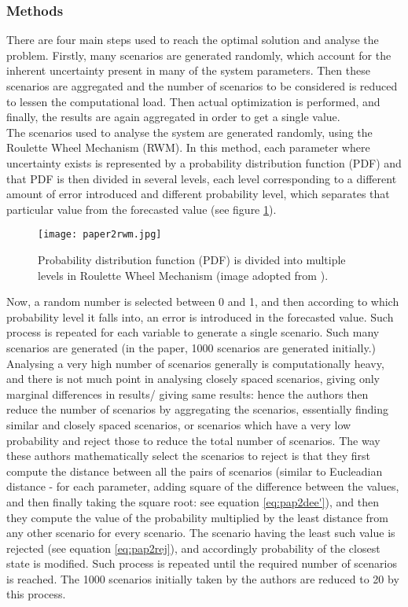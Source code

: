 \subsubsection{Methods}
There are four main steps used to reach the optimal solution and analyse the problem. Firstly, many scenarios are generated randomly, which account for the inherent uncertainty present in many of the system parameters. Then these scenarios are aggregated and the number of scenarios to be considered is reduced to lessen the computational load. Then actual optimization is performed, and finally, the results are again aggregated in order to get a single value.\\
The scenarios used to analyse the system are generated randomly, using the Roulette Wheel Mechanism (RWM). In this method, each parameter where uncertainty exists is represented by a probability distribution function (PDF) and that PDF is then divided in several levels, each level corresponding to a different amount of error introduced and different probability level, which separates that particular value from the forecasted value (see figure \ref{fig:pap2rwm}).
\begin{figure}[tbp]
  \centering
    \texttt{[image: paper2rwm.jpg]}%
    \caption[Roulette Wheel Mechanism]{Probability distribution function (PDF) is divided into multiple levels in Roulette Wheel Mechanism (image adopted from \cite{Kavousi-Fard2016653}).}
    \label{fig:pap2rwm} 
\end{figure}
Now, a random number is selected between 0 and 1, and then according to which probability level it falls into, an error is introduced in the forecasted value. Such process is repeated for each variable to generate a single scenario. Such many scenarios are generated (in the paper, 1000 scenarios are generated initially.)\\
Analysing a very high number of scenarios generally is computationally heavy, and there is not much point in analysing closely spaced scenarios, giving only marginal differences in results/ giving same results: hence the authors then reduce the number of scenarios by aggregating the scenarios, essentially finding similar and closely spaced scenarios, or scenarios which have a very low probability and reject those to reduce the total number of scenarios. The way these authors mathematically select the scenarios to reject is that they first compute the distance between all the pairs of scenarios (similar to Eucleadian distance -  for each parameter, adding square of the difference between the values, and then finally taking the square root: see equation \eqref{eq:pap2dee'}), and then they compute the value of the probability multiplied by the least distance from any other scenario for every scenario. The scenario having the least such value is rejected (see equation \eqref{eq:pap2rej}), and accordingly probability of the closest state is modified. Such process is repeated until the required number of scenarios is reached. The 1000 scenarios initially taken by the authors are reduced to 20 by this process.\\
